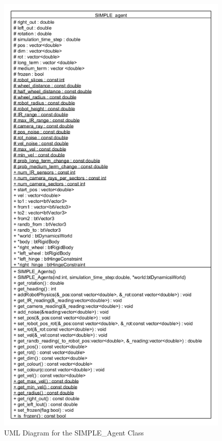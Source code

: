 \begin{figure}[h]
\centering
\includegraphics[scale=0.5]{Chapter2/images/simple_agent_uml.png}
\caption{UML Diagram for the SIMPLE\_Agent Class}
\label{fig:agent_uml}
\end{figure}


